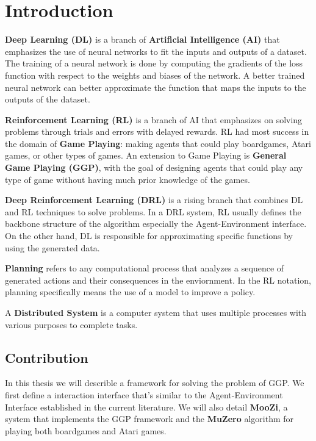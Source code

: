 \documentclass[12pt]{article}
\newcommand{\note}[1]{\todo[color=yellow!40,bordercolor=none,linecolor=black]{#1}}
\begin{document}
\listoftodos

\tableofcontents

\section{Introduction}

\note{8 - 10 pages of introduction}

\textbf{Deep Learning (DL)} is a branch of \textbf{Artificial Intelligence (AI)} that emphasizes the use of neural networks to fit the inputs and outputs of a dataset.
The training of a neural network is done by computing the gradients of the loss function with respect to the weights and biases of the network.
A better trained neural network can better approximate the function that maps the inputs to the outputs of the dataset.

\textbf{Reinforcement Learning (RL)} is a branch of AI that emphasizes on solving problems through trials and errors with delayed rewards.
RL had most success in the domain of \textbf{Game Playing}: making agents that could play boardgames, Atari games, or other types of games.
An extension to Game Playing is \textbf{General Game Playing (GGP)}, with the goal of designing agents that could play any type of game without having much prior knowledge of the games.
\note{discuss policy}

\textbf{Deep Reinforcement Learning (DRL)} is a rising branch that combines DL and RL techniques to solve problems.
In a DRL system, RL usually defines the backbone structure of the algorithm especially the Agent-Environment interface.
On the other hand, DL is responsible for approximating specific functions by using the generated data.

\textbf{Planning} refers to any computational process that analyzes a sequence of generated actions and their consequences in the enviornment.
In the RL notation, planning specifically means the use of a model to improve a policy.

A \textbf{Distributed System} is a computer system that uses multiple processes with various purposes to complete tasks.

\subsection{Contribution}
In this thesis we will describle a framework for solving the problem of GGP.
We first define a interaction interface that's similar to the Agent-Environment Interface established in the current literature.
We will also detail \textbf{MooZi}, a system that implements the GGP framework and the \textbf{MuZero} algorithm for playing both boardgames and Atari games.
\end{document}
